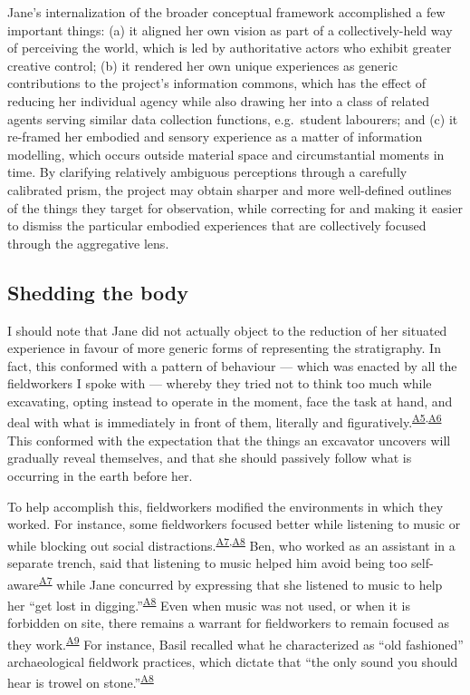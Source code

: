 \documentclass[
]{article}
\begin{document}
Jane's internalization of the broader conceptual framework accomplished
a few important things: (a) it aligned her own vision as part of a
collectively-held way of perceiving the world, which is led by
authoritative actors who exhibit greater creative control; (b) it
rendered her own unique experiences as generic contributions to the
project's information commons, which has the effect of reducing her
individual agency while also drawing her into a class of related agents
serving similar data collection functions, e.g.~student labourers; and
(c) it re-framed her embodied and sensory experience as a matter of
information modelling, which occurs outside material space and
circumstantial moments in time. By clarifying relatively ambiguous
perceptions through a carefully calibrated prism, the project may obtain
sharper and more well-defined outlines of the things they target for
observation, while correcting for and making it easier to dismiss the
particular embodied experiences that are collectively focused through
the aggregative lens.

\subsection{Shedding the body}\label{shedding-the-body}

I should note that Jane did not actually object to the reduction of her
situated experience in favour of more generic forms of representing the
stratigraphy. In fact, this conformed with a pattern of behaviour ---
which was enacted by all the fieldworkers I spoke with --- whereby they
tried not to think too much while excavating, opting instead to operate
in the moment, face the task at hand, and deal with what is immediately
in front of them, literally and
figuratively.\textsuperscript{\hyperref[sec-A5]{A5},\hyperref[sec-A6]{A6}}
This conformed with the expectation that the things an excavator
uncovers will gradually reveal themselves, and that she should passively
follow what is occurring in the earth before her.

To help accomplish this, fieldworkers modified the environments in which
they worked. For instance, some fieldworkers focused better while
listening to music or while blocking out social
distractions.\textsuperscript{\hyperref[sec-A7]{A7},\hyperref[sec-A8]{A8}}
Ben, who worked as an assistant in a separate trench, said that
listening to music helped him avoid being too
self-aware\textsuperscript{\hyperref[sec-A7]{A7}} while Jane concurred
by expressing that she listened to music to help her ``get lost in
digging.''\textsuperscript{\hyperref[sec-A8]{A8}} Even when music was
not used, or when it is forbidden on site, there remains a warrant for
fieldworkers to remain focused as they
work.\textsuperscript{\hyperref[sec-A9]{A9}} For instance, Basil
recalled what he characterized as ``old fashioned'' archaeological
fieldwork practices, which dictate that ``the only sound you should hear
is trowel on stone.''\textsuperscript{\hyperref[sec-A8]{A8}}
\end{document}
